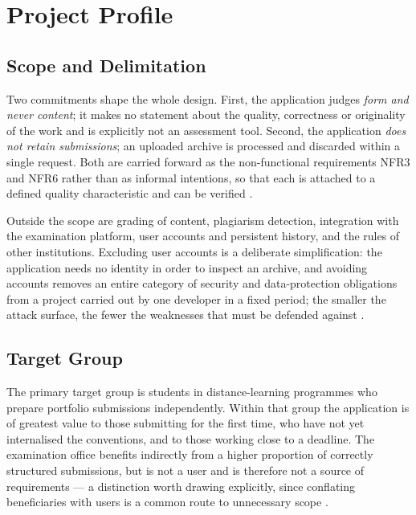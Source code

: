 \documentclass[a4paper,11pt]{article}
\begin{document}
\section{Project Profile}\label{sec:profile}

\subsection{Scope and Delimitation}\label{subsec:scope}

Two commitments shape the whole design. First, the application judges
\textit{form and never content}; it makes no statement about the quality,
correctness or originality of the work and is explicitly not an assessment tool.
Second, the application \textit{does not retain submissions}; an uploaded
archive is processed and discarded within a single request. Both are carried
forward as the non-functional requirements NFR3 and NFR6 rather than as informal
intentions, so that each is attached to a defined quality characteristic and can
be verified \citep{ISO25010}.

Outside the scope are grading of content, plagiarism detection, integration with
the examination platform, user accounts and persistent history, and the rules of
other institutions. Excluding user accounts is a deliberate simplification: the
application needs no identity in order to inspect an archive, and avoiding
accounts removes an entire category of security and data-protection obligations
from a project carried out by one developer in a fixed period; the smaller the
attack surface, the fewer the weaknesses that must be defended against
\citep{OWASP2021}.

\subsection{Target Group}\label{subsec:target}

The primary target group is students in distance-learning programmes who prepare
portfolio submissions independently. Within that group the application is of
greatest value to those submitting for the first time, who have not yet
internalised the conventions, and to those working close to a deadline. The
examination office benefits indirectly from a higher proportion of correctly
structured submissions, but is not a user and is therefore not a source of
requirements --- a distinction worth drawing explicitly, since conflating
beneficiaries with users is a common route to unnecessary scope
\citep{Sommerville2020}.
\end{document}
